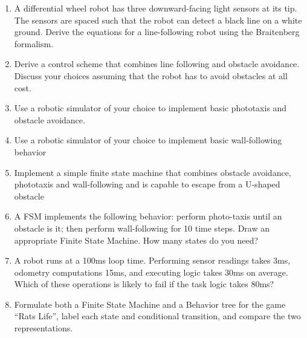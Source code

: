 \begin{enumerate}
\item A differential wheel robot has three downward-facing light sensors at its tip. The sensors are spaced such that the robot can detect a black line on a white ground. Derive the equations for a line-following robot using the Braitenberg formalism.
\item Derive a control scheme that combines line following and obstacle avoidance. Discuss your choices assuming that the robot has to avoid obstacles at all cost.
\item Use a robotic simulator of your choice to implement basic phototaxis and obstacle avoidance.
\item Use a robotic simulator of your choice to implement basic wall-following behavior
\item Implement a simple finite state machine that combines obstacle avoidance, phototaxis and wall-following and is capable to escape from a U-shaped obstacle
\item A FSM implements the following behavior: perform photo-taxis until an obstacle is it; then perform wall-following for 10 time steps. Draw an appropriate Finite State Machine. How many states do you need?
\item A robot runs at a 100ms loop time. Performing sensor readings takes 3ms, odometry computations 15ms, and executing logic takes 30ms on average. Which of these operations is likely to fail if the task logic takes 80ms?
\item Formulate both a Finite State Machine and a Behavior tree for the game ``Rats Life'', label each state and conditional transition, and compare the two representations.
\end{enumerate}
